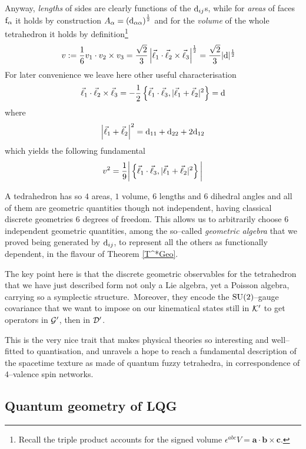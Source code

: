 Anyway, \emph{lengths} of sides are clearly functions of the $\text{\normalfont d}_{ij}$s, while for \emph{areas} of faces $\text{\normalfont f}_\alpha$ it holds by construction $A_\alpha={(\text{\normalfont d}_{\alpha\alpha})}^{\frac{1}{2}}$ and for the \emph{volume} of the whole tetrahedron it holds by definition\footnote{Recall the triple product accounts for the signed volume $\epsilon^{abc}V=\mathbf{a}\cdot\mathbf{b}\times\mathbf{c}.$}
\begin{align*}
    v&:=\frac{1}{6}v_1\cdot v_2\times v_3=\frac{\sqrt{2}}{3}\left|\vec{\ell}_1\cdot\vec{\ell}_2\times\vec{\ell}_3\right|^{\frac{1}{2}}=\frac{\sqrt{2}}{3}|\text{\normalfont d}|^{\frac{1}{2}}
\end{align*}
For later convenience we leave here other useful characterisation
$$\vec{\ell}_1\cdot\vec{\ell}_2\times\vec{\ell}_3=-\frac{1}{2}\left\{\vec{\ell}_1\cdot\vec{\ell}_3,|\vec{\ell}_1+\vec{\ell}_2|^2\right\}=\text{\normalfont d}$$
where
$$\left|\vec{\ell}_1+\vec{\ell}_2\right|^2=\text{\normalfont d}_{11}+\text{\normalfont d}_{22}+2\text{\normalfont d}_{12}$$
which yields the following fundamental
\begin{equation}\label{volume}
    v^2=\frac{1}{9}\bigg|\left\{\vec{\ell}_1\cdot\vec{\ell}_3,|\vec{\ell}_1+\vec{\ell}_2|^2\right\}\bigg|
\end{equation}


A tedrahedron has so $4$ areas, $1$ volume, $6$ lengths and $6$ dihedral angles and all of them are geometric quantities though not independent, having classical discrete geometries $6$ degrees of freedom. This allows us to arbitrarily choose $6$ independent geometric quantities, among the so--called \emph{geometric algebra} that we proved being generated by $\text{\normalfont d}_{ij}$, to represent all the others as functionally dependent, in the flavour of Theorem \ref{T^*Geo}.

The key point here is that the discrete geometric observables for the tetrahedron that we have just described form not only a Lie algebra, yet a Poisson algebra, carrying so a symplectic structure.\, Moreover, they encode the $\text{\normalfont SU}(2)$--gauge covariance that we want to impose on our kinematical states still in $\mathcal{K}'$ to get operators in $\mathcal{G}'$, then in $\mathcal{D}'$. 

This is the very nice trait that makes physical theories so interesting and well--fitted to quantisation, and unravels a hope to reach a fundamental description of the spacetime texture as made of quantum fuzzy tetrahedra, in correspondence of $4$--valence spin networks.


\newpage
\subsection{Quantum geometry of LQG}\label{QuantumGeoTetrahedra_section}

